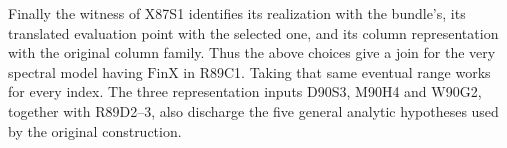Finally the witness of X87S1 identifies its realization with the
bundle's, its translated evaluation point with the selected one,
and its column representation with the original column family.
Thus the above choices give a join for the very spectral model
having $\mathrm{FinX}$ in R89C1. Taking that same eventual range
works for every index. The three representation inputs D90S3,
M90H4 and W90G2, together with R89D2--3, also discharge the five
general analytic hypotheses used by the original construction.
